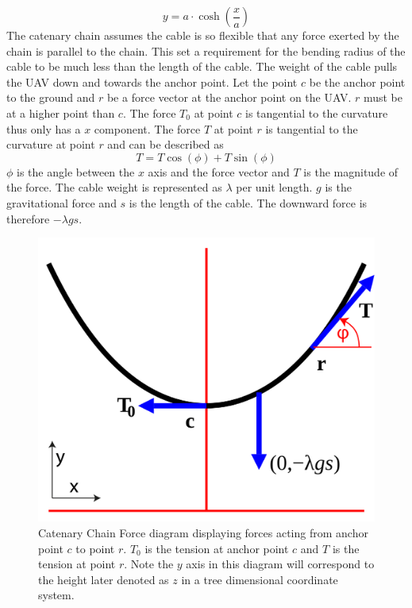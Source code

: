 \begin{equation}
y = a \cdot \cosh\left(\frac{x}{a}\right)
\end{equation}
The catenary chain assumes the cable is so flexible that any force exerted by the chain is parallel to the chain. This set a requirement for the bending radius of the cable to be much less than the length of the cable.
The weight of the cable pulls the UAV down and towards the anchor point. Let the point $c$ be the anchor point to the ground and $r$ be a force vector at the anchor point on the UAV. $r$ must be at a higher point than $c$. The force $T_0$ at point $c$ is tangential to the curvature thus only has a $x$ component. The force $T$ at point $r$ is tangential to the curvature at point $r$ and can be described as
\begin{equation}
T = T \cos(\phi) +  T\sin(\phi)
\end{equation} 
$\phi$ is the angle between the $x$ axis and the force vector and $T$ is the magnitude of the force. The cable weight is represented as $\lambda$ per unit length. $g$ is the gravitational force and $s$ is the length of the cable. The downward force is therefore $-\lambda g s$.

\begin{figure}[hbtp]
\centering
\includegraphics[scale=0.25]{graphics/CatenaryForceDiagram.png}
\caption[Catenary Chain Force diagram]{Catenary Chain Force diagram displaying forces acting from anchor point $c$ to point $r$. $T_0$ is the tension at anchor point $c$ and $T$ is the tension at point $r$. Note the $y$ axis in this diagram will correspond to the height later denoted as $z$ in a tree dimensional coordinate system.}
\label{fig:catenary_force_diagram}
\end{figure}

